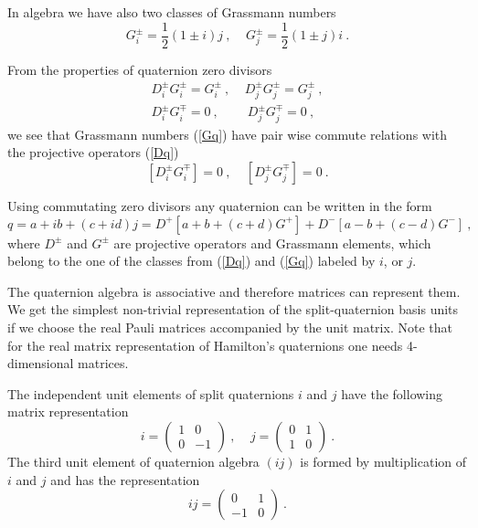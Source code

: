 \documentclass[a4paper,12pt]{article}
\begin{document}
In algebra we have also two classes of Grassmann numbers 
\begin{equation} \label{Gq}
G^\pm_i = \frac{1}{2}(1 \pm i)j ~, ~~~~~ G^\pm_j = \frac{1}{2}(1 \pm j)i ~. 
\end{equation}

From the properties of quaternion zero divisors 
\begin{eqnarray} \label{DGq}
D^\pm_i G^\pm_i = G^\pm_i ~, ~~~~~ D^\pm_j G^\pm_j = G^\pm_j ~, \nonumber\\
D^\pm_i G^\mp_i = 0 ~, ~~~~~~~~~~ D^\pm_j G^\mp_j = 0 ~, 
\end{eqnarray}
we see that Grassmann numbers (\ref{Gq}) have pair wise commute relations with the 
projective operators (\ref{Dq})
\begin{equation} \label{[dg]}
[D^\pm_i G^\mp_i] = 0 ~, ~~~~~ [D^\pm_j G^\mp_j] = 0 ~.
\end{equation}

Using commutating zero divisors any quaternion can be written in the form
\begin{equation} \label{qDec}
q = a +ib +(c +id)j = D^+[a+b + (c + d)G^+] + D^-[a-b +(c - d)G^-] ~,
\end{equation}
where $D^\pm$ and $G^\pm$ are projective operators and Grassmann elements, which belong 
to the one of the classes from (\ref{Dq}) and (\ref{Gq}) labeled by $i$, or $j$.

The quaternion algebra is associative and therefore matrices can represent them. We get 
the simplest non-trivial representation of the split-quaternion basis units if we choose 
the real Pauli matrices accompanied by the unit matrix. Note that for the real matrix 
representation of Hamilton's quaternions one needs 4-dimensional matrices. 

The independent unit elements of split quaternions $i$ and $j$ have the following matrix 
representation 
\[ i = \left( \begin{array}{cc} 1 & 0 \\  
                                0 & -1   
      \end{array} \right) ~, ~~~~~
j = \left( \begin{array}{cc} 0 & 1 \\  
                             1 & 0   
            \end{array} \right) ~. \]
The third unit element of quaternion algebra $(ij)$ is formed by multiplication of $i$ 
and $j$ and has the representation
\[ ij = \left( \begin{array}{cc} 0 & 1 \\  
                                -1 & 0   
      \end{array} \right) ~.\]
\end{document}
